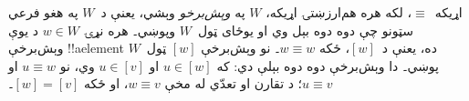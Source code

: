 \documentclass[../../../include/open-logic-section]{subfiles}
\begin{document}
اړيکه~$\equiv$، لکه هره هم‌ارزښتۍ اړيکه، $W$ په \emph{وېش‌برخو}
وېشي، يعنې د~$W$ په هغو فرعي سټونو چې دوه دوه بېل وي او يوځای ټول~$W$
وپوښي۔ هره نړۍ $w \in W$ د يوې وېش‌برخې !!a{element} ده، يعنې
د~$[w]$، ځکه $w \equiv w$۔ نو وېش‌برخې $[w]$ ټول~$W$ پوښي۔ دا
وېش‌برخې دوه دوه بېلې دي: که $u \in [w]$ او $u \in [v]$ وي، نو
$u \equiv w$ او $u \equiv v$؛ د تقارن او تعدّي له مخې
$w \equiv v$، او ځکه $[w] = [v]$۔
\end{document}
